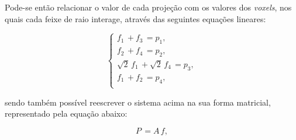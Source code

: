 Pode-se então relacionar o valor de cada projeção com os valores dos \textit{voxels}, nos quais cada feixe de raio interage, através das seguintes equações lineares:

\begin{equation}
\begin{cases}
f_{1} \, + f_{3} \, = p_{1}, \\ 
f_{2} \, + f_{4} \, = p_{2}, \\ 
\sqrt{2} \, f_{1} \, + \sqrt{2} \, f_{4} \, = p_{3}, \\ 
f_{1} \, + f_{2} \, = p_{4}, \\ 
\end{cases}
\label{eq:eqCap3EquacoesLineares}
\end{equation} 

\noindent sendo também possível reescrever o sistema acima na sua forma matricial, representado pela equação abaixo:

\begin{equation}
P \, = A \, f,
\label{eq:eqCap3MatrizEquacoesLineares1}
\end{equation}

